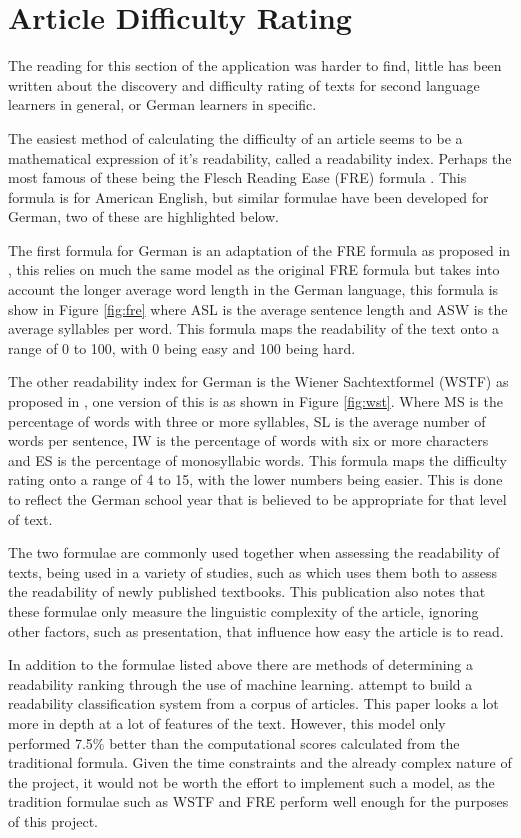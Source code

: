 \section{Article Difficulty Rating}

The reading for this section of the application was harder to find, little has been written about the discovery and difficulty rating of texts for second language learners in general, or German learners in specific. 

The easiest method of calculating the difficulty of an article seems to be a mathematical expression of it's readability, called a readability index. Perhaps the most famous of these being the Flesch Reading Ease (FRE) formula \autocite{flesch1948}. This formula is for American English, but similar formulae have been developed for German, two of these are highlighted below.

The first formula for German is an adaptation of the FRE formula as proposed in \textcite{amstad1978}, this relies on much the same model as the original FRE formula but takes into account the longer average word length in the German language, this formula is show in Figure \ref{fig:fre} where ASL is the average sentence length and ASW is the average syllables per word. This formula maps the readability of the text onto a range of 0 to 100, with 0 being easy and 100 being hard. 



The other readability index for German is the  Wiener Sachtextformel (WSTF) as proposed in \textcite{bamberger1984}, one version of this is as shown in Figure \ref{fig:wst}. Where MS is the percentage of words with three or more syllables, SL is the average number of words per sentence, IW is the percentage of words with six or more characters and ES is the percentage of monosyllabic words. This formula maps the difficulty rating onto a range of 4 to 15, with the lower numbers being easier. This is done to reflect the German school year that is believed to be appropriate for that level of text.



The two formulae are commonly used together when assessing the readability of texts, being used in a variety of studies, such as \textcite{rottensteiner2010} which uses them both to assess the readability of newly published textbooks. This publication also notes that these formulae only measure the linguistic complexity of the article, ignoring other factors, such as presentation, that influence how easy the article is to read. 

In addition to the formulae listed above there are methods of determining a readability ranking through the use of machine learning. \textcite{hancke2012} attempt to build a readability classification system from a corpus of articles. This paper looks a lot more in depth at a lot of features of the text. However, this model only performed 7.5\% better than the computational scores calculated from the traditional formula. Given the time constraints and the already complex nature of the project, it would not be worth the effort to implement such a model, as the tradition formulae such as WSTF and FRE perform well enough for the purposes of this project. 